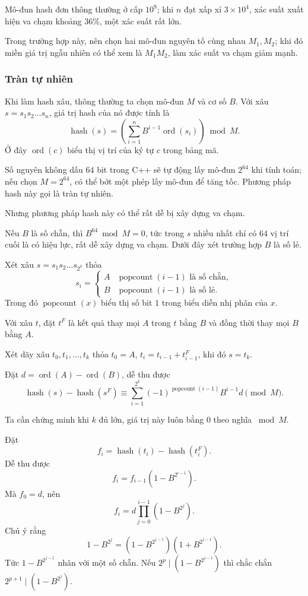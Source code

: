 \documentclass[11pt]{article}
\begin{document}
Mô-đun hash đơn thông thường ở cấp $10^9$; khi $n$ đạt xấp xỉ $3\times 10^4$,
xác suất xuất hiện va chạm khoảng $36\%$, một xác suất rất lớn.

Trong trường hợp này, nên chọn hai mô-đun nguyên tố cùng nhau $M_1,M_2$; khi đó
miền giá trị ngẫu nhiên có thể xem là $M_1M_2$, làm xác suất va chạm giảm mạnh.

\subsubsection{Tràn tự nhiên}

Khi làm hash xâu, thông thường ta chọn mô-đun $M$ và cơ số $B$. Với xâu
$s=s_1s_2\ldots s_n$, giá trị hash của nó được tính là
\[
\operatorname{hash}(s)=
\left(\sum_{i=1}^n B^{i-1}\operatorname{ord}(s_i)\right)\bmod M.
\]
Ở đây $\operatorname{ord}(c)$ biểu thị vị trí của ký tự $c$ trong bảng mã.

Số nguyên không dấu $64$ bit trong C++ sẽ tự động lấy mô-đun $2^{64}$ khi tính
toán; nếu chọn $M=2^{64}$, có thể bớt một phép lấy mô-đun để tăng tốc. Phương
pháp hash này gọi là tràn tự nhiên.

Nhưng phương pháp hash này có thể rất dễ bị xây dựng va chạm.

Nếu $B$ là số chẵn, thì $B^{64}\bmod M=0$, tức trong $s$ nhiều nhất chỉ có
$64$ vị trí cuối là có hiệu lực, rất dễ xây dựng va chạm. Dưới đây xét trường
hợp $B$ là số lẻ.

Xét xâu $s=s_1s_2\ldots s_{2^k}$ thỏa
\[
s_i=
\begin{cases}
A & \operatorname{popcount}(i-1)\text{ là số chẵn},\\
B & \operatorname{popcount}(i-1)\text{ là số lẻ}.
\end{cases}
\]
Trong đó $\operatorname{popcount}(x)$ biểu thị số bit $1$ trong biểu diễn nhị
phân của $x$.

Với xâu $t$, đặt $t^F$ là kết quả thay mọi $A$ trong $t$ bằng $B$ và đồng thời
thay mọi $B$ bằng $A$.

Xét dãy xâu $t_0,t_1,\ldots,t_k$ thỏa $t_0=A$,
$t_i=t_{i-1}+t_{i-1}^F$, khi đó $s=t_k$.

Đặt $d=\operatorname{ord}(A)-\operatorname{ord}(B)$, dễ thu được
\[
\operatorname{hash}(s)-\operatorname{hash}(s^F)
\equiv
\sum_{i=1}^{2^k}(-1)^{\operatorname{popcount}(i-1)}B^{i-1}d
\pmod M.
\]

Ta cần chứng minh khi $k$ đủ lớn, giá trị này luôn bằng $0$ theo nghĩa
$\bmod M$.

Đặt
\[
f_i=\operatorname{hash}(t_i)-\operatorname{hash}(t_i^F).
\]
Dễ thu được
\[
f_i=f_{i-1}(1-B^{2^{i-1}}).
\]
Mà $f_0=d$, nên
\[
f_i=d\prod_{j=0}^{i-1}(1-B^{2^j}).
\]
Chú ý rằng
\[
1-B^{2^j}=(1-B^{2^{j-1}})(1+B^{2^{j-1}}).
\]
Tức $1-B^{2^{j-1}}$ nhân với một số chẵn. Nếu
$2^p\mid(1-B^{2^{j-1}})$ thì chắc chắn
$2^{p+1}\mid(1-B^{2^j})$.
\end{document}
